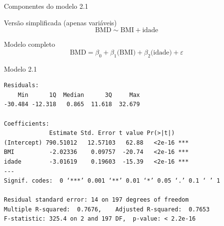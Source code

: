 \documentclass{beamer}
\begin{document}
\begin{frame}{\small Componentes do modelo 2.1}
  \begin{block}{\footnotesize Versão simplificada (apenas variáveis)}
    \footnotesize
    \begin{displaymath}
      \text{BMD} \sim \text{BMI} + \text{idade}
    \end{displaymath}
  \end{block}
  \bigskip
  \bigskip
  \begin{block}{Modelo completo}
    \begin{displaymath}
      \text{BMD} =\beta_0 + \beta_1 \text{(BMI)} + \beta_2 \text{(idade)} +\varepsilon
    \end{displaymath}
  \end{block}
  \vfill
\end{frame}

\begin{frame}[fragile]{}
  \begin{center}
    \begin{exampleblock}{Modelo 2.1}
      \tiny
\begin{verbatim}
Residuals:
    Min      1Q  Median      3Q     Max 
-30.484 -12.318   0.865  11.618  32.679 

Coefficients:
             Estimate Std. Error t value Pr(>|t|)    
(Intercept) 790.51012   12.57103   62.88   <2e-16 ***
BMI          -2.02336    0.09757  -20.74   <2e-16 ***
idade        -3.01619    0.19603  -15.39   <2e-16 ***
---
Signif. codes:  0 ‘***’ 0.001 ‘**’ 0.01 ‘*’ 0.05 ‘.’ 0.1 ‘ ’ 1

Residual standard error: 14 on 197 degrees of freedom
Multiple R-squared:  0.7676,	Adjusted R-squared:  0.7653 
F-statistic: 325.4 on 2 and 197 DF,  p-value: < 2.2e-16
\end{verbatim}
    \end{exampleblock}
  \end{center}
\end{frame}
\end{document}

